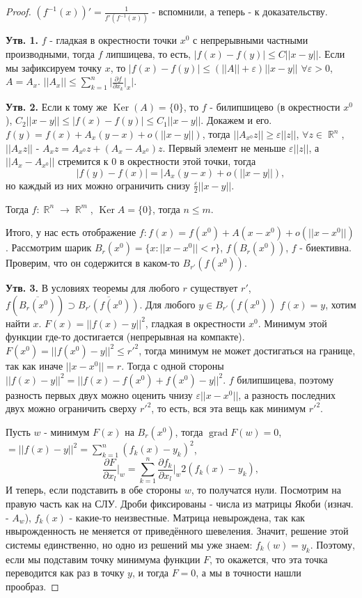 \documentclass[a4paper,100pt]{article}
\theoremstyle{indented}
\theoremstyle{definition}
\theoremstyle{remark}
\DeclareMathOperator{\Ker}{Ker}
\DeclareMathOperator{\RR}{\mathbb{R}}
\DeclareMathOperator{\grad}{grad}
\begin{document}
\begin{proof}
    $(f^{-1}(x))' = \frac{1}{f'(f^{-1}(x))}$ - вспомнили, а теперь - к доказательству. \ 

    \textbf{Утв. 1.} $f$ - гладкая в окрестности точки $x^0$ с непрерывными частными производными, тогда $f$ липшицева, то есть, $|f(x)-f(y)|\leq C||x-y||$. Если мы зафиксируем точку $x$, то $|f(x)-f(y)|\leq(||A||+\varepsilon)||x-y||$ $\forall \varepsilon >0$, $A=A_x$. $||A_x||\leq\sum_{k=1}^n\bigg|\frac{\partial f}{\partial x_k}\bigg|_x\bigg|$. \ 

    \textbf{Утв. 2.} Если к тому же $\Ker (A)=\{0\}$, то $f$ - билипшицево (в окрестности $x^0$), $C_2||x-y||\leq |f(x)-f(y)|\leq C_1||x-y||$. Докажем и его. $f(y)= f(x)+A_x(y-x)+o(||x-y||)$, тогда $||A_{x^0}z||\geq \varepsilon ||z||$, $\forall z\in \RR^n$, $||A_xz||$ - $A_xz= A_{x^0}z+(A_x-A_{x^0})z$. Первый элемент не меньше $\varepsilon ||z||$, а $||A_x-A_{x^0}||$ стремится к 0 в окрестности этой точки, тогда 
    \[
        |f(y)-f(x)|=|A_x(y-x)+o(||x-y||),
    \]
    но каждый из них можно ограничить снизу $\frac{\varepsilon}{2}||x-y||$. \ 

    Тогда $f:\RR^n\rightarrow \RR^m$, $\Ker A= \{0\}$, тогда $n\leq m$. \ 

    Итого, у нас есть отображение $f:f(x)=f(x^0)+A(x-x^0)+o(||x-x^0||)$. Рассмотрим шарик $B_r(x^0)=\{x:||x-x^0||<r\}$, $f(B_r(x^0))$, $f$ - биективна. Проверим, что он содержится в каком-то $B_{r'}(f(x^0))$. \ 

    \textbf{Утв. 3.} В условиях теоремы для любого $r$ существует $r'$, $f(\overline{B_r(x^0)})\supset \overline{B_{r'}(f(x^0))}$. Для любого $y\in B_{r'}(f(x^0))$ $f(x)=y$, хотим найти $x$. $F(x)= ||f(x)-y||^2$, гладкая в окрестности $x^0$. Минимум этой функции где-то достигается (непрерывная на компакте). $F(x^0)= ||f(x^0)-y||^2\leq r'^2$, тогда минимум не может достигаться на границе, так как иначе $||x-x^0||=r$. Тогда с одной стороны $||f(x)-y||^2=||f(x)-f(x^0)+f(x^0)-y||^2$. $f$ билипшицева, поэтому разность первых двух можно оценить чнизу $\varepsilon||x-x^0||$, а разность последних двух можно ограничить сверху $r'^2$, то есть, вся эта вещь как минимум $r'^2$. \ 

    Пусть $w$ - минимум $F(x)$ на $B_r(x^0)$, тогда $\grad F(w)=0$,  $=||f(x)-y||^2 = \sum_{k=1}^n(f_k(x)-y_k)^2$, 
    \[
        \frac{\partial F}{\partial x_l}\bigg|_w = \sum_{k=1}^n\frac{\partial f_k}{\partial x_l}\bigg|_w 2(f_k(x)-y_k), 
    \]
    И теперь, если подставить в обе стороны $w$, то получатся нули. Посмотрим на правую часть как на СЛУ. Дроби фиксированы - числа из матрицы Якоби (изнач. - $A_w$), $f_k(x)$ - какие-то неизвестные. Матрица невырождена, так как нвырожденность не меняется от приведённого шевеления. Значит, решение этой системы единственно, но одно из решений мы уже знаем: $f_k(w)=y_k$. Поэтому, если мы подставим точку минимума функции $F$, то окажется, что эта точка переводится как раз в точку $y$, и тогда $F=0$, а мы в точности нашли прообраз.
\end{proof}
\end{document}
